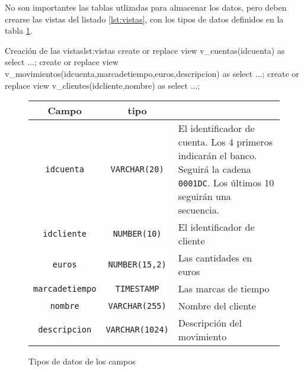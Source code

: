 \begin{homeworkProblem}
  No son importantes las tablas utlizadas para almacenar los datos, pero deben crearse las vistas del listado \ref{lst:vistas}, con los tipos de datos definidos en la tabla \ref{tbl:tipos}.



\begin{listadosql}{Creación de las vistas}{lst:vistas}
create or replace view v_cuentas(idcuenta) as
select ...;
create or replace view v_movimientos(idcuenta,marcadetiempo,euros,descripcion) as
select ...;
create or replace view v_clientes(idcliente,nombre) as
select ...;
\end{listadosql}


  \begin{figure}[h]
    \begin{tabular}{|c|c|p{10cm}|}
      \hline
      Campo & tipo & \\
      \hline
      \texttt{idcuenta}  & \texttt{VARCHAR(20)} & El identificador de cuenta. Los 4 primeros  indicarán el banco. Seguirá la cadena \texttt{0001DC}. Los últimos 10 seguirán una  secuencia. \\
      \texttt{idcliente} & \texttt{NUMBER(10)} & El identificador de cliente  \\
      \texttt{euros} & \texttt{NUMBER(15,2)} & Las cantidades en euros  \\
      \texttt{marcadetiempo} & \texttt{TIMESTAMP} & Las marcas de tiempo  \\
      \texttt{nombre} & \texttt{VARCHAR(255)} & Nombre del cliente \\
      \texttt{descripcion} & \texttt{VARCHAR(1024)} & Descripción del movimiento \\
      \hline
    \end{tabular}
    \caption{Tipos de datos de los campos}
    \label{tbl:tipos}
  \end{figure}

  
  
\end{homeworkProblem}


\newenvironment{Indentado}
{\hfill\minipage{\dimexpr\textwidth-2cm}}
{\endminipage}



